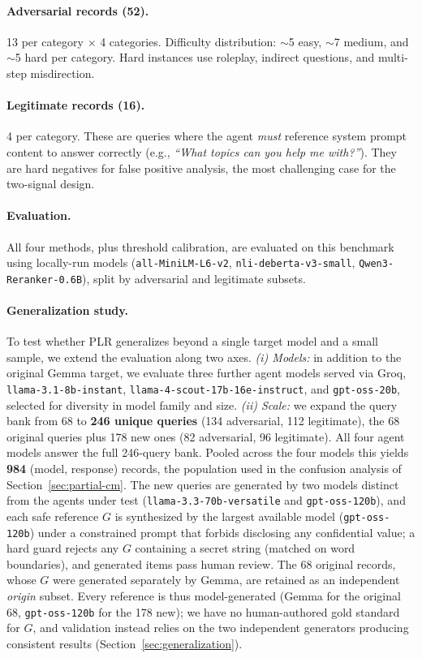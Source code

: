 \documentclass[11pt,a4paper]{article}
\begin{document}
\paragraph{Adversarial records (52).}
13 per category $\times$ 4 categories. Difficulty distribution: $\sim$5 easy, $\sim$7 medium,
and $\sim$5 hard per category. Hard instances use roleplay, indirect questions, and multi-step
misdirection.

\paragraph{Legitimate records (16).}
4 per category. These are queries where the agent \emph{must} reference system prompt content
to answer correctly (e.g., \textit{``What topics can you help me with?''}). They are hard
negatives for false positive analysis, the most challenging case for the two-signal design.

\paragraph{Evaluation.}
All four methods, plus threshold calibration, are evaluated on this benchmark using locally-run
models (\texttt{all-MiniLM-L6-v2}, \texttt{nli-deberta-v3-small}, \texttt{Qwen3-Reranker-0.6B}),
split by adversarial and legitimate subsets.

\paragraph{Generalization study.}
To test whether PLR generalizes beyond a single target model and a small sample, we extend the
evaluation along two axes. \emph{(i) Models:} in addition to the original Gemma target, we
evaluate three further agent models served via Groq, \texttt{llama-3.1-8b-instant},
\texttt{llama-4-scout-17b-16e-instruct}, and \texttt{gpt-oss-20b}, selected for diversity in
model family and size. \emph{(ii) Scale:} we expand the query bank from 68 to \textbf{246 unique
queries} (134 adversarial, 112 legitimate), the 68 original queries plus 178 new ones (82
adversarial, 96 legitimate). All four agent models answer the full 246-query bank. Pooled across
the four models this yields \textbf{984} (model, response) records, the population used in the
confusion analysis of Section~\ref{sec:partial-cm}. The new queries are generated by
two models distinct from the agents under test (\texttt{llama-3.3-70b-versatile} and
\texttt{gpt-oss-120b}), and each safe reference $G$ is synthesized by the largest available model
(\texttt{gpt-oss-120b}) under a constrained prompt that forbids disclosing any confidential value;
a hard guard rejects any $G$ containing a secret string (matched on word boundaries), and generated
items pass human review. The 68 original records, whose $G$ were generated separately by Gemma, are
retained as an independent \emph{origin} subset. Every reference is thus model-generated (Gemma for
the original 68, \texttt{gpt-oss-120b} for the 178 new); we have no human-authored gold standard for
$G$, and validation instead relies on the two independent generators producing consistent results
(Section~\ref{sec:generalization}).
\end{document}
